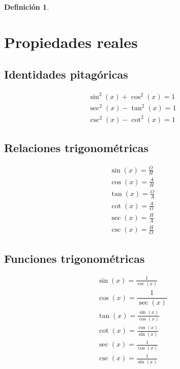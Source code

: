 \documentclass[a5paper,12pt,twoside]{book}
\newtheorem{defn}{{Definición}}[chapter]
\begin{document}
\begin{mdframed}[style=MyFrame1]
    \begin{defn}
    \end{defn}
\end{mdframed}


\chapter{Propiedades reales}


\section{Identidades pitagóricas}

\begin{gather*}
    \sin^2{(x)} + \cos^2{(x)} = 1
    \\
    \sec^2{(x)} - \tan^2{(x)} = 1
    \\
    \csc^2{(x)} - \cot^2{(x)} = 1
\end{gather*}


\section{Relaciones trigonométricas}

\begin{gather*}
    \sin{(x)}=\frac{O}{H}
    \\[1ex]
    \cos{(x)}=\frac{A}{H}
    \\[1ex]
    \tan{(x)}=\frac{O}{A}
    \\[1ex]
    \cot{(x)}=\frac{A}{O}
    \\[1ex]
    \sec{(x)}=\frac{H}{A}
    \\[1ex]
    \csc{(x)}=\frac{H}{O}
\end{gather*}


\section{Funciones trigonométricas}

\begin{gather*}
    \sin{(x)}=\frac{1}{\csc{(x)}}
    \\[1ex]
    \cos{(x)}=\dfrac{1}{\sec{(x)}}
    \\[1ex]
    \tan{(x)}=\frac{\sin{(x)}}{\cos{(x)}}
    \\[1ex]
    \cot{(x)}=\frac{\cos{(x)}}{\sin{(x)}}
    \\[1ex]
    \sec{(x)}=\frac{1}{\cos{(x)}}
    \\[1ex]
    \csc{(x)}=\frac{1}{\sin{(x)}}
\end{gather*}
\end{document}
